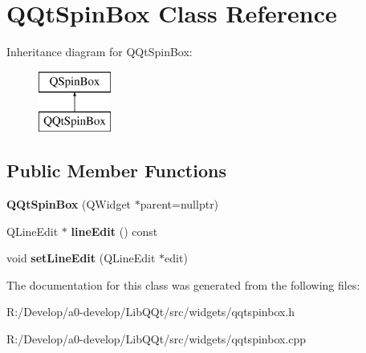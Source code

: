 \hypertarget{class_q_qt_spin_box}{}\section{Q\+Qt\+Spin\+Box Class Reference}
\label{class_q_qt_spin_box}
Inheritance diagram for Q\+Qt\+Spin\+Box\+:\begin{figure}[H]
\begin{center}
\leavevmode
\includegraphics[height=2.000000cm]{class_q_qt_spin_box}
\end{center}
\end{figure}
\subsection*{Public Member Functions}
\begin{DoxyCompactItemize}
\item 
\mbox{\label{class_q_qt_spin_box_a2ad9482cf61a9f2b43aa5d5a2959896e}} 
{\bfseries Q\+Qt\+Spin\+Box} (Q\+Widget $\ast$parent=nullptr)
\item 
\mbox{\label{class_q_qt_spin_box_ae5bfb127f99e89c50c074475951bf6e5}} 
Q\+Line\+Edit $\ast$ {\bfseries line\+Edit} () const
\item 
\mbox{\label{class_q_qt_spin_box_ad4f91ce9214a1e382b1b0e0b06f67512}} 
void {\bfseries set\+Line\+Edit} (Q\+Line\+Edit $\ast$edit)
\end{DoxyCompactItemize}


The documentation for this class was generated from the following files\+:\begin{DoxyCompactItemize}
\item 
R\+:/\+Develop/a0-\/develop/\+Lib\+Q\+Qt/src/widgets/qqtspinbox.\+h\item 
R\+:/\+Develop/a0-\/develop/\+Lib\+Q\+Qt/src/widgets/qqtspinbox.\+cpp\end{DoxyCompactItemize}
